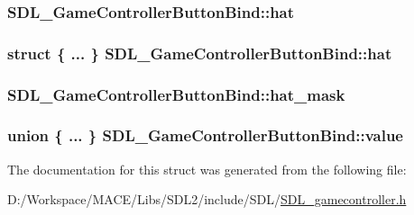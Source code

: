 \subsubsection[{\texorpdfstring{hat}{hat}}]{ S\+D\+L\+\_\+\+Game\+Controller\+Button\+Bind\+::hat}\hypertarget{struct_s_d_l___game_controller_button_bind_aa71f0e94721b28ee35aec0d1ac1c200e}{}\label{struct_s_d_l___game_controller_button_bind_aa71f0e94721b28ee35aec0d1ac1c200e}
\subsubsection[{\texorpdfstring{hat}{hat}}]{\setlength{\rightskip}{0pt plus 5cm}struct \{ ... \}   S\+D\+L\+\_\+\+Game\+Controller\+Button\+Bind\+::hat}\hypertarget{struct_s_d_l___game_controller_button_bind_a0191ea1ae377e147b81dfee93156d2f2}{}\label{struct_s_d_l___game_controller_button_bind_a0191ea1ae377e147b81dfee93156d2f2}
\subsubsection[{\texorpdfstring{hat\+\_\+mask}{hat_mask}}]{ S\+D\+L\+\_\+\+Game\+Controller\+Button\+Bind\+::hat\+\_\+mask}\hypertarget{struct_s_d_l___game_controller_button_bind_a9f1197eb0a12d824946d59ee6c4a2999}{}\label{struct_s_d_l___game_controller_button_bind_a9f1197eb0a12d824946d59ee6c4a2999}
\subsubsection[{\texorpdfstring{value}{value}}]{\setlength{\rightskip}{0pt plus 5cm}union \{ ... \}   S\+D\+L\+\_\+\+Game\+Controller\+Button\+Bind\+::value}\hypertarget{struct_s_d_l___game_controller_button_bind_a617787596bd34e89e7619a585cab0c94}{}\label{struct_s_d_l___game_controller_button_bind_a617787596bd34e89e7619a585cab0c94}


The documentation for this struct was generated from the following file\+:\begin{DoxyCompactItemize}
\item 
D\+:/\+Workspace/\+M\+A\+C\+E/\+Libs/\+S\+D\+L2/include/\+S\+D\+L/\hyperlink{_s_d_l__gamecontroller_8h}{S\+D\+L\+\_\+gamecontroller.\+h}\end{DoxyCompactItemize}
